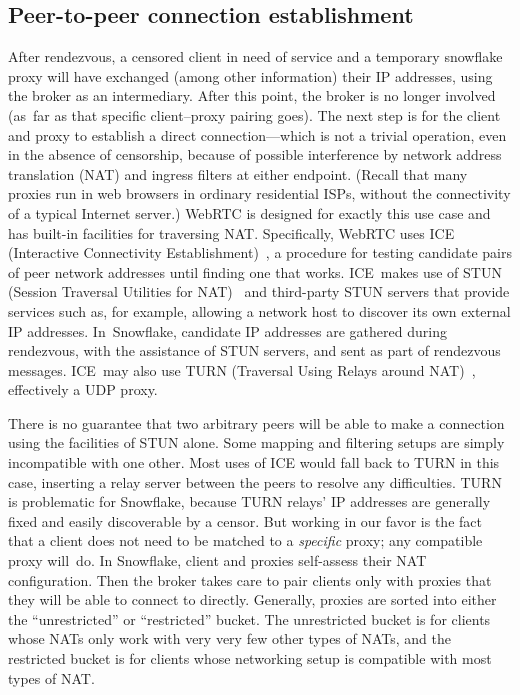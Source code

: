 \documentclass[letterpaper,twocolumn]{article}
\begin{document}
\subsection{Peer-to-peer connection establishment}
\label{sec:ice}

After rendezvous,
a censored client in need of service
and a temporary snowflake proxy
will have exchanged
(among other information)
their IP addresses,
using the broker as an intermediary.
After this point, the broker is no longer involved
(as~far as that specific client--proxy pairing goes).
The next step is for the client and proxy
to establish a direct connection---which
is not a trivial operation,
even in the absence of censorship,
because of possible interference by
network address translation (NAT)
and ingress filters at either endpoint.
(Recall that many proxies run in web browsers
in ordinary residential ISPs,
without the connectivity of a typical Internet server.)
WebRTC is designed for exactly this use case
and has built-in facilities for traversing NAT.
Specifically, WebRTC uses
ICE (Interactive Connectivity Establishment)~\cite{rfc8445},
a procedure for testing candidate pairs of peer network addresses
until finding one that works.
ICE~makes use of
STUN (Session Traversal Utilities for NAT)~\cite{rfc8489}
and third-party STUN servers that provide services such as,
for example, allowing a network host to
discover its own external IP addresses.
In~Snowflake, candidate IP addresses are gathered
during rendezvous, with the assistance of STUN servers,
and sent as part of rendezvous messages.
ICE~may also use
TURN (Traversal Using Relays around NAT)~\cite{rfc8656},
effectively a UDP proxy.

There is no guarantee that two arbitrary peers will be able to make
a connection using the facilities of STUN alone.
Some mapping and
filtering setups are simply incompatible with one other.
Most uses of ICE would fall back to TURN in this case,
inserting a relay server between the peers to resolve any difficulties.
TURN is problematic for Snowflake,
because TURN relays' IP addresses are
generally fixed and easily discoverable by a censor.
But working in our favor is the fact that
a client does not need to be matched to a \emph{specific} proxy;
any compatible proxy will~do.
In Snowflake, client and proxies self-assess their NAT configuration.
Then the broker takes care to pair clients
only with proxies that they will be able to connect to directly.
Generally, proxies are sorted into either the
``unrestricted'' or ``restricted'' bucket. 
The unrestricted bucket is for clients whose NATs only work with very 
very few other types of NATs, and the 
restricted bucket is for clients whose networking setup is compatible 
with most types of NAT.
\end{document}
